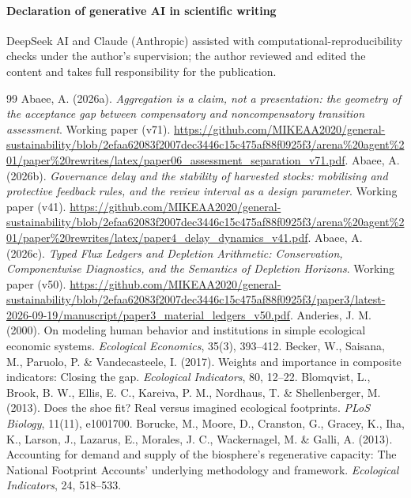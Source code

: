\documentclass[preprint,12pt,authoryear]{elsarticle}
\begin{document}
\paragraph{Declaration of generative AI in scientific writing} DeepSeek AI and Claude (Anthropic) assisted with computational-reproducibility checks under the author's supervision; the author reviewed and edited the content and takes full responsibility for the publication.
\begin{thebibliography}{99}
 Abaee, A. (2026a). \emph{Aggregation is a claim, not a presentation: the geometry of the acceptance gap between compensatory and noncompensatory transition assessment}. Working paper (v71). \url{https://github.com/MIKEAA2020/general-sustainability/blob/2efaa62083f2007dec3446c15c475af88f0925f3/arena%20agent%201/paper%20rewrites/latex/paper06_assessment_separation_v71.pdf}.
 Abaee, A. (2026b). \emph{Governance delay and the stability of harvested stocks: mobilising and protective feedback rules, and the review interval as a design parameter}. Working paper (v41). \url{https://github.com/MIKEAA2020/general-sustainability/blob/2efaa62083f2007dec3446c15c475af88f0925f3/arena%20agent%201/paper%20rewrites/latex/paper4_delay_dynamics_v41.pdf}.
 Abaee, A. (2026c). \emph{Typed Flux Ledgers and Depletion Arithmetic: Conservation, Componentwise Diagnostics, and the Semantics of Depletion Horizons}. Working paper (v50). \url{https://github.com/MIKEAA2020/general-sustainability/blob/2efaa62083f2007dec3446c15c475af88f0925f3/paper3/latest-2026-09-19/manuscript/paper3_material_ledgers_v50.pdf}.
 Anderies, J. M. (2000). On modeling human behavior and institutions in simple ecological economic systems. \emph{Ecological Economics}, 35(3), 393--412.
 Becker, W., Saisana, M., Paruolo, P. \& Vandecasteele, I. (2017). Weights and importance in composite indicators: Closing the gap. \emph{Ecological Indicators}, 80, 12--22.
 Blomqvist, L., Brook, B. W., Ellis, E. C., Kareiva, P. M., Nordhaus, T. \& Shellenberger, M. (2013). Does the shoe fit? Real versus imagined ecological footprints. \emph{PLoS Biology}, 11(11), e1001700.
 Borucke, M., Moore, D., Cranston, G., Gracey, K., Iha, K., Larson, J., Lazarus, E., Morales, J. C., Wackernagel, M. \& Galli, A. (2013). Accounting for demand and supply of the biosphere's regenerative capacity: The National Footprint Accounts' underlying methodology and framework. \emph{Ecological Indicators}, 24, 518--533.

\end{thebibliography}
\end{document}
